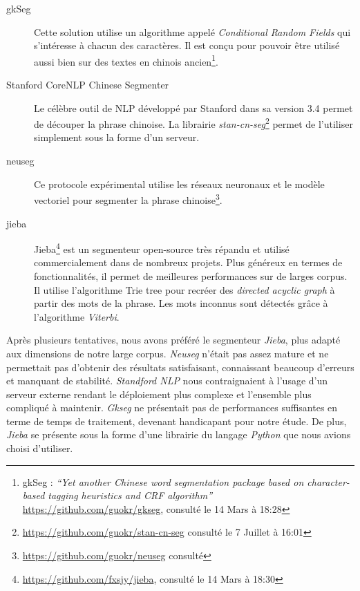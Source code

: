     \begin{description}
        \item[gkSeg] 
        Cette solution utilise un algorithme appelé \textit{Conditional Random Fields} qui s'intéresse à chacun des caractères. Il est conçu pour pouvoir être utilisé aussi bien sur des  textes en chinois ancien\footnote{ gkSeg : \textit{{\textquotedblleft}Yet another Chinese word segmentation package based on character-based tagging heuristics and CRF algorithm{\textquotedblright} }\url{https://github.com/guokr/gkseg}, consulté le 14 Mars à 18:28}.

        \item[Stanford CoreNLP Chinese Segmenter]
        Le célèbre outil de NLP développé par Stanford dans sa version 3.4 permet de découper la phrase chinoise. La librairie \textit{stan-cn-seg}\footnote{\url{https://github.com/guokr/stan-cn-seg} consulté le 7 Juillet à 16:01} permet de l'utiliser simplement sous la forme d'un serveur.

        \item[neuseg]
        Ce protocole expérimental utilise les réseaux neuronaux et le modèle vectoriel pour segmenter la phrase chinoise\footnote{\url{https://github.com/guokr/neuseg} consulté }.

        \item[jieba]
        Jieba\footnote{ \url{https://github.com/fxsjy/jieba}, consulté le 14 Mars à 18:30} est un segmenteur open-source très répandu et utilisé commercialement dans de nombreux projets. Plus généreux en termes de fonctionnalités, il permet de meilleures performances sur de larges corpus. Il utilise l'algorithme Trie tree pour recréer des \textit{directed acyclic graph} à partir des mots de la phrase. Les mots inconnus sont détectés grâce à l'algorithme \textit{Viterbi}.
    \end{description}

     Après plusieurs tentatives, nous avons préféré le segmenteur \textit{Jieba}, plus adapté aux dimensions de notre large corpus. \textit{Neuseg} n'était pas assez mature et ne permettait pas d'obtenir des résultats satisfaisant, connaissant beaucoup d'erreurs et manquant de stabilité. \textit{Standford NLP} nous contraignaient à l'usage d'un serveur externe rendant le déploiement plus complexe et l'ensemble plus compliqué à maintenir. \textit{Gkseg} ne présentait pas de performances suffisantes en terme de temps de traitement, devenant handicapant pour notre étude. De plus, \textit{Jieba} se présente sous la forme d'une librairie du langage \textit{Python} que nous avions choisi d'utiliser.

